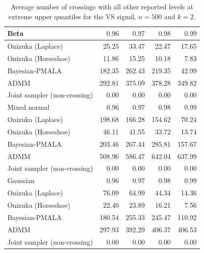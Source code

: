 \begin{table}[!htbp]
\centering
\small
\caption{Average number of crossings with all other reported levels at extreme upper quantiles for the VS signal, $n=500$ and $k=2$.}
\label{tab:vs_ext_upper_cross_all}
\begin{tabular}{lrrrr}
\toprule
Beta & $0.96$ & $0.97$ & $0.98$ & $0.99$ \\
\midrule
Onizuka (Laplace) & 25.25 & 33.47 & 22.47 & 17.65 \\
Onizuka (Horseshoe) & 11.86 & 15.25 & 10.18 & 7.83 \\
Bayesian-PMALA & 182.35 & 262.43 & 219.35 & 42.99 \\
ADMM & 292.81 & 375.09 & 378.28 & 349.82 \\
Joint sampler (non-crossing) & 0.00 & 0.00 & 0.00 & 0.00 \\
\midrule
Mixed normal & $0.96$ & $0.97$ & $0.98$ & $0.99$ \\
\midrule
Onizuka (Laplace) & 198.68 & 166.28 & 154.62 & 70.24 \\
Onizuka (Horseshoe) & 46.11 & 41.55 & 33.72 & 13.74 \\
Bayesian-PMALA & 203.46 & 267.44 & 285.81 & 157.67 \\
ADMM & 508.96 & 586.47 & 642.04 & 637.99 \\
Joint sampler (non-crossing) & 0.00 & 0.00 & 0.00 & 0.00 \\
\midrule
Gaussian & $0.96$ & $0.97$ & $0.98$ & $0.99$ \\
\midrule
Onizuka (Laplace) & 76.09 & 64.99 & 44.34 & 14.36 \\
Onizuka (Horseshoe) & 22.40 & 23.89 & 16.21 & 7.56 \\
Bayesian-PMALA & 180.54 & 255.33 & 245.47 & 110.92 \\
ADMM & 297.93 & 392.29 & 406.37 & 406.53 \\
Joint sampler (non-crossing) & 0.00 & 0.00 & 0.00 & 0.00 \\
\bottomrule
\end{tabular}
\end{table}

